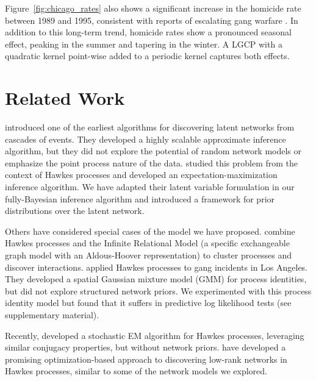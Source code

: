 Figure~\ref{fig:chicago_rates} also shows a significant increase in the homicide rate between 1989 and 1995, consistent with reports of escalating gang warfare \cite{Block-1993}. In addition to this long-term trend, homicide rates show a pronounced seasonal effect, peaking in the summer and tapering in the winter. A LGCP with a quadratic kernel point-wise added to a periodic kernel captures both effects.

\section{Related Work}
\citet{Gomez-2010} introduced one of the earliest algorithms for discovering latent networks from cascades of events. They developed a highly scalable approximate inference algorithm, but they did not explore the potential of random network models or emphasize the point process nature of the data. %
\citet{Simma-2010} studied this problem from the context of Hawkes processes and developed an expectation-maximization inference algorithm.
We have adapted their latent variable formulation in our fully-Bayesian inference algorithm and introduced a framework for prior distributions over the latent network. 

Others have considered special cases of the model we have proposed. \citet{Blundell-2012} combine Hawkes processes and the Infinite Relational Model (a specific exchangeable graph model with an Aldous-Hoover representation) to cluster  processes and discover interactions. \citet{Cho-2013} applied Hawkes processes to gang incidents in Los Angeles. They developed a spatial Gaussian mixture model (GMM) for process identities, but did not explore structured network priors. We experimented with this process identity model but found that it suffers in predictive log likelihood tests (see supplementary material). 

Recently, \citet{Iwata-2013} developed a stochastic EM algorithm for Hawkes processes, leveraging similar conjugacy properties, but without network priors. \citet{Zhou-2013} have developed a promising optimization-based approach to discovering low-rank networks in Hawkes processes, similar to some of the network models we explored.

